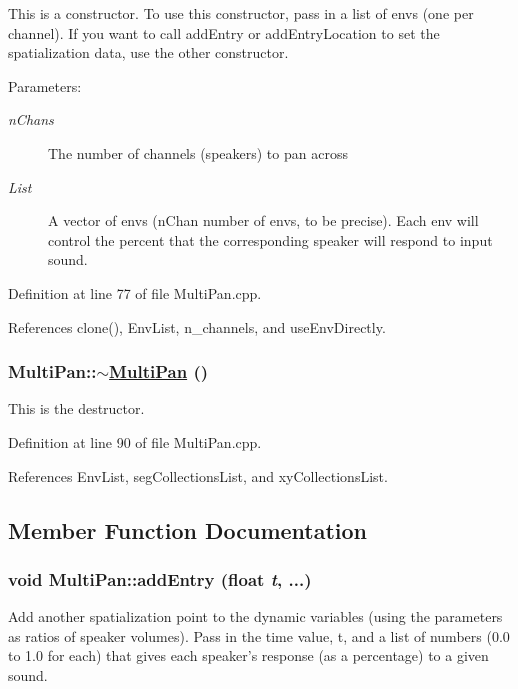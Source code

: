 This is a constructor. To use this constructor, pass in a list of envs (one per channel). If you want to call add\-Entry or add\-Entry\-Location to set the spatialization data, use the other constructor.

\begin{Desc}
\item[Parameters:]
\begin{description}
\item[{\em n\-Chans}]The number of channels (speakers) to pan across \item[{\em List}]A vector of envs (n\-Chan number of envs, to be precise). Each env will control the percent that the corresponding speaker will respond to input sound. \end{description}
\end{Desc}


Definition at line 77 of file Multi\-Pan.cpp.

References clone(), Env\-List, n\_\-channels, and use\-Env\-Directly.\hypertarget{classMultiPan_a2}{
\subsubsection[$\sim$MultiPan]{\setlength{\rightskip}{0pt plus 5cm}Multi\-Pan::$\sim$\hyperlink{classMultiPan}{Multi\-Pan} ()}}
\label{classMultiPan_a2}


This is the destructor. 

Definition at line 90 of file Multi\-Pan.cpp.

References Env\-List, seg\-Collections\-List, and xy\-Collections\-List.

\subsection{Member Function Documentation}
\hypertarget{classMultiPan_a4}{
\subsubsection[addEntry]{\setlength{\rightskip}{0pt plus 5cm}void Multi\-Pan::add\-Entry (float {\em t}, ...)}}
\label{classMultiPan_a4}


Add another spatialization point to the dynamic variables (using the parameters as ratios of speaker volumes). Pass in the time value, t, and a list of numbers (0.0 to 1.0 for each) that gives each speaker's response (as a percentage) to a given sound.

